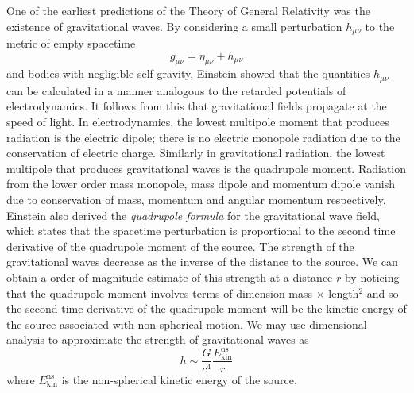 One of the earliest predictions of the Theory of General Relativity was the
existence of gravitational waves. By considering a small perturbation
$h_{\mu\nu}$ to the metric of empty spacetime
\begin{equation}
g_{\mu\nu} = \eta_{\mu\nu} + h_{\mu\nu}
\end{equation}
and bodies with negligible self-gravity, Einstein showed that the quantities
$h_{\mu\nu}$ can be calculated in a manner analogous to the retarded
potentials of electrodynamics\cite{Einstein:1916}.  It follows from this that
gravitational fields propagate at the speed of light.  In electrodynamics, the
lowest multipole moment that produces radiation is the electric dipole; there
is no electric monopole radiation due to the conservation of electric charge.
Similarly in gravitational radiation, the lowest multipole that produces
gravitational waves is the quadrupole moment. Radiation from the lower order
mass monopole, mass dipole and momentum dipole vanish due to conservation of
mass, momentum and angular momentum respectively. Einstein also derived the
\emph{quadrupole formula} for the gravitational wave field, which states that
the spacetime perturbation is proportional to the second time derivative of
the quadrupole moment of the source.  The strength of the gravitational waves
decrease as the inverse of the distance to the source.  We can obtain a order
of magnitude estimate of this strength at a distance $r$ by noticing that
the quadrupole moment involves terms of dimension mass $\times$ length$^2$ and
so the second time derivative of the quadrupole moment will be the kinetic
energy of the source associated with non-spherical motion.  We may use
dimensional analysis to approximate the strength of gravitational waves as
\begin{equation}
h \sim \frac{G}{c^4}\frac{E^\mathrm{ns}_\mathrm{kin}}{r}
\end{equation}
where $E^\mathrm{ns}_\mathrm{kin}$ is the non-spherical kinetic energy of
the source.

